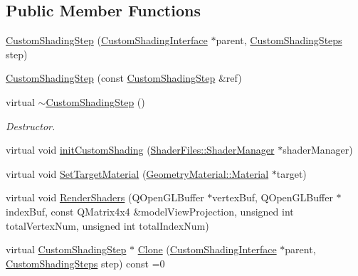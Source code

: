 \subsection*{Public Member Functions}
\begin{DoxyCompactItemize}
\item 
\mbox{\hyperlink{class_geometry_engine_1_1_custom_shading_1_1_custom_shading_step_aa1a71e276f9a94557ca2fd8db4c1f438}{Custom\+Shading\+Step}} (\mbox{\hyperlink{class_geometry_engine_1_1_custom_shading_1_1_custom_shading_interface}{Custom\+Shading\+Interface}} $\ast$parent, \mbox{\hyperlink{namespace_geometry_engine_1_1_custom_shading_a2dc236a5b567da5099069ce2b2be5609}{Custom\+Shading\+Steps}} step)
\item 
\mbox{\hyperlink{class_geometry_engine_1_1_custom_shading_1_1_custom_shading_step_a78d86dd99b93d0ae1c9a4de8f01a4f1a}{Custom\+Shading\+Step}} (const \mbox{\hyperlink{class_geometry_engine_1_1_custom_shading_1_1_custom_shading_step}{Custom\+Shading\+Step}} \&ref)
\item 
\mbox{\label{class_geometry_engine_1_1_custom_shading_1_1_custom_shading_step_a9568a325e6b8de96bc6dc7fa82d53bf5}} 
virtual \mbox{\hyperlink{class_geometry_engine_1_1_custom_shading_1_1_custom_shading_step_a9568a325e6b8de96bc6dc7fa82d53bf5}{$\sim$\+Custom\+Shading\+Step}} ()
\begin{DoxyCompactList}\small\item\em Destructor. \end{DoxyCompactList}\item 
virtual void \mbox{\hyperlink{class_geometry_engine_1_1_custom_shading_1_1_custom_shading_step_a219df9763bb85663703d763589930025}{init\+Custom\+Shading}} (\mbox{\hyperlink{class_shader_files_1_1_shader_manager}{Shader\+Files\+::\+Shader\+Manager}} $\ast$shader\+Manager)
\item 
virtual void \mbox{\hyperlink{class_geometry_engine_1_1_custom_shading_1_1_custom_shading_step_a7113c454f34a3870df11420749f21d11}{Set\+Target\+Material}} (\mbox{\hyperlink{class_geometry_engine_1_1_geometry_material_1_1_material}{Geometry\+Material\+::\+Material}} $\ast$target)
\item 
virtual void \mbox{\hyperlink{class_geometry_engine_1_1_custom_shading_1_1_custom_shading_step_a313d42de4ed533f8871a22467575fb55}{Render\+Shaders}} (Q\+Open\+G\+L\+Buffer $\ast$vertex\+Buf, Q\+Open\+G\+L\+Buffer $\ast$index\+Buf, const Q\+Matrix4x4 \&model\+View\+Projection, unsigned int total\+Vertex\+Num, unsigned int total\+Index\+Num)
\item 
virtual \mbox{\hyperlink{class_geometry_engine_1_1_custom_shading_1_1_custom_shading_step}{Custom\+Shading\+Step}} $\ast$ \mbox{\hyperlink{class_geometry_engine_1_1_custom_shading_1_1_custom_shading_step_aa9279c195d3a8f294860a431508675c3}{Clone}} (\mbox{\hyperlink{class_geometry_engine_1_1_custom_shading_1_1_custom_shading_interface}{Custom\+Shading\+Interface}} $\ast$parent, \mbox{\hyperlink{namespace_geometry_engine_1_1_custom_shading_a2dc236a5b567da5099069ce2b2be5609}{Custom\+Shading\+Steps}} step) const =0
\end{DoxyCompactItemize}
